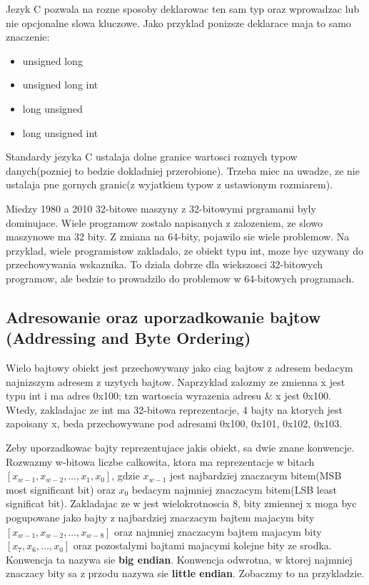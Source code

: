 \documentclass{article}
\begin{document}
Jezyk C pozwala na rozne sposoby deklarowac ten sam typ oraz wprowadzac lub nie opcjonalne slowa kluczowe. Jako przyklad ponizsze deklarace maja to samo znaczenie:
\begin{itemize}
    \item unsigned long
    \item unsigned long int
    \item long unsigned
    \item long unsigned int
\end{itemize}

Standardy jezyka C ustalaja dolne granice wartosci roznych typow danych(pozniej to bedzie dokladniej przerobione). Trzeba miec na uwadze, ze nie ustalaja pne gornych granic(z wyjatkiem typow z ustawionym rozmiarem). 

Miedzy 1980 a 2010 32-bitowe maszyny z 32-bitowymi prgramami byly dominujace. Wiele programow zostalo napisanych z zalozeniem, ze slowo maszynowe ma 32 bity. Z zmiana na 64-bity, pojawilo sie wiele problemow. Na przyklad, wiele programistow zakladalo, ze obiekt typu int, moze byc uzywany do przechowywania wskaznika. To dziala dobrze dla wiekszosci 32-bitowych programow, ale bedzie to prowadzilo do problemow w 64-bitowych programach.

\subsection{Adresowanie oraz uporzadkowanie bajtow (Addressing and Byte Ordering)}

Wielo bajtowy obiekt jest przechowywany jako ciag bajtow z adresem bedacym najnizszym adresem z uzytych bajtow. Naprzyklad zalozmy ze zmienna x jest typu int i ma adres 0x100; tzn wartoscia wyrazenia adresu \& x jest 0x100. Wtedy, zakladajac ze int ma 32-bitowa reprezentacje, 4 bajty na ktorych jest zapoisany x, beda przechowywane pod adresami 0x100, 0x101, 0x102, 0x103.

Zeby uporzadkowac bajty reprezentujace jakis obiekt, sa dwie znane konwencje. Rozwazmy w-bitowa liczbe calkowita, ktora ma reprezentacje w bitach $[x_{w-1}, x_{w-2},\dots, x_{1}, x_{0}]$, gdzie $x_{w-1}$ jest najbardziej znaczacym bitem(MSB most significant bit) oraz $x_{0}$ bedacym najmniej znaczacym bitem(LSB least significat bit). Zakladajac ze w jest wielokrotnoscia 8, bity zmiennej x moga byc pogupowane jako bajty z najbardziej znaczacym bajtem majacym bity $[x_{w-1}, x_{w-2}, \dots, x_{w-8}]$ oraz najmniej znaczacym bajtem majacym bity $[x_{7}, x_{6}, \dots, x_{0}]$ oraz pozostalymi bajtami majacymi kolejne bity ze srodka. Konwencja ta nazywa sie \textbf{big endian}. Konwencja odwrotna, w ktorej najmniej znaczacy bity sa z przodu nazywa sie \textbf{little endian}. Zobaczmy to na przykladzie.
\end{document}
